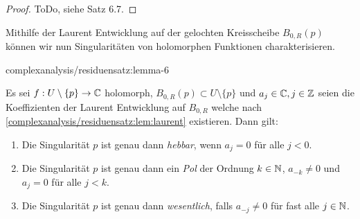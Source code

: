\begin{proof}
 ToDo, siehe \cite{Nee17} Satz 6.7.
\end{proof}

\par
Mithilfe der Laurent Entwicklung auf der gelochten Kreisscheibe \(B_{0,R}(p)\) können wir nun Singularitäten von holomorphen Funktionen charakterisieren.
\begin{lemma}{}{complexanalysis/residuensatz:lemma-6}



\par
Es sei \(f:U\setminus\{p\}\to\mathbb{C}\) holomorph, \(B_{0,R}(p)\subset U\setminus\{p\}\) und \(a_j\in\mathbb{C}, j\in\mathbb{Z}\) seien die Koeffizienten der Laurent Entwicklung auf \(B_{0,R}\) welche nach \cref{complexanalysis/residuensatz:lem:laurent} existieren. Dann gilt:
\begin{enumerate}

\item {} 
\par
Die Singularität \(p\) ist genau dann \emph{hebbar}, wenn \(a_{j}=0\) für alle \(j<0\).

\item {} 
\par
Die Singularität \(p\) ist genau dann ein \emph{Pol} der Ordnung \(k\in\mathbb{N}\), \(a_{-k}\neq 0\) und \(a_j = 0\) für alle \(j<k\).

\item {} 
\par
Die Singularität \(p\) ist genau dann \emph{wesentlich}, falls \(a_{-j}\neq 0\) für fast alle \(j\in\mathbb{N}\).

\end{enumerate}
\end{lemma}


